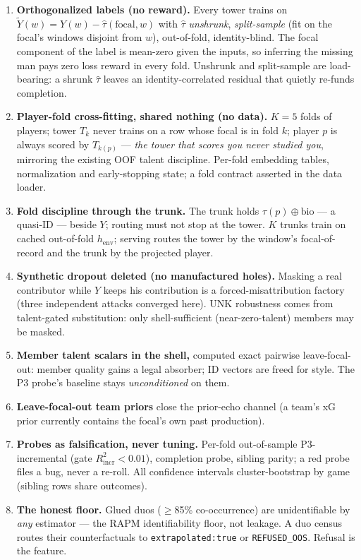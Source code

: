 \documentclass[11pt]{article}
\newcommand{\henv}{\ensuremath{h_{\mathrm{env}}}}
\begin{document}
\begin{enumerate}[leftmargin=1.5em,itemsep=2pt]
\item \textbf{Orthogonalized labels (no reward).} Every tower trains on
$\tilde{Y}(w) = Y(w) - \hat{\tau}(\mathrm{focal}, w)$ with $\hat{\tau}$
\emph{unshrunk}, \emph{split-sample} (fit on the focal's windows disjoint from
$w$), out-of-fold, identity-blind. The focal component of the label is mean-zero
given the inputs, so inferring the missing man pays zero loss reward in every
fold. Unshrunk and split-sample are load-bearing: a shrunk $\hat\tau$ leaves an
identity-correlated residual that quietly re-funds completion.
\item \textbf{Player-fold cross-fitting, shared nothing (no data).} $K{=}5$
folds of players; tower $T_k$ never trains on a row whose focal is in fold $k$;
player $p$ is always scored by $T_{k(p)}$ --- \emph{the tower that scores you
never studied you}, mirroring the existing OOF talent discipline. Per-fold
embedding tables, normalization and early-stopping state; a fold contract
asserted in the data loader.
\item \textbf{Fold discipline through the trunk.} The trunk holds
$\tau(p)\oplus\mathrm{bio}$ --- a quasi-ID --- beside $Y$; routing must not stop
at the tower. $K$ trunks train on cached out-of-fold \henv{}; serving routes the
tower by the window's focal-of-record and the trunk by the projected player.
\item \textbf{Synthetic dropout deleted (no manufactured holes).} Masking a real
contributor while $Y$ keeps his contribution is a forced-misattribution factory
(three independent attacks converged here). UNK robustness comes from
talent-gated substitution: only shell-sufficient (near-zero-talent) members may
be masked.
\item \textbf{Member talent scalars in the shell,} computed exact pairwise
leave-focal-out: member quality gains a legal absorber; ID vectors are freed for
style. The P3 probe's baseline stays \emph{unconditioned} on them.
\item \textbf{Leave-focal-out team priors} close the prior-echo channel (a
team's xG prior currently contains the focal's own past production).
\item \textbf{Probes as falsification, never tuning.} Per-fold out-of-sample
P3-incremental (gate $R^2_{\mathrm{incr}} < 0.01$), completion probe, sibling
parity; a red probe files a bug, never a re-roll. All confidence intervals
cluster-bootstrap by game (sibling rows share outcomes).
\item \textbf{The honest floor.} Glued duos ($\ge$85\% co-occurrence) are
unidentifiable by \emph{any} estimator --- the RAPM identifiability floor, not
leakage. A duo census routes their counterfactuals to
\texttt{extrapolated:true} or \texttt{REFUSED\_OOS}. Refusal is the feature.
\end{enumerate}
\end{document}
